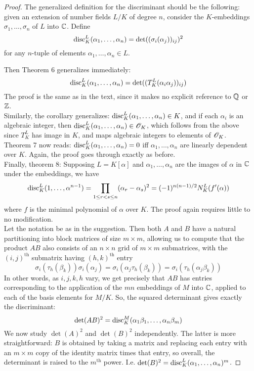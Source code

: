 \begin{proof}
	The generalized definition for the discriminant should be the following: given an extension of number fields $L/K$ of degree $n$, consider the $K$-embeddings $\sigma_1,\ldots,\sigma_n$ of $L$ into $\mathbb{C}$. Define
	\[ \operatorname{disc}^L_K(\alpha_1,\ldots,\alpha_n) = \det((\sigma_i(\alpha_j))_{ij})^2 \]
	for any $n$-tuple of elements $\alpha_1,\ldots,\alpha_n \in L$.
	
	Then Theorem 6 generalizes immediately:
	\[ \operatorname{disc}^L_K(\alpha_1,\ldots,\alpha_n) = \det((T^L_K(\alpha_i\alpha_j))_{ij}) \]
	The proof is the same as in the text, since it makes no explicit reference to $\mathbb{Q}$ or $\mathbb{Z}$. \\
	
	Similarly, the corollary generalizes: $\operatorname{disc}^L_K(\alpha_1,\ldots,\alpha_n) \in K$, and if each $\alpha_i$ is an algebraic integer, then $\operatorname{disc}^L_K(\alpha_1,\ldots,\alpha_n) \in \mathscr{O}_K$, which follows from the above since $T^L_K$ has image in $K$, and maps algebraic integers to elements of $\mathscr{O}_K$. \\
	
	Theorem 7 now reads: $\operatorname{disc}^L_K(\alpha_1,\ldots,\alpha_n) = 0$ iff $\alpha_1,\ldots,\alpha_n$ are linearly dependent over $K$. Again, the proof goes through exactly as before. \\
	
	Finally, theorem 8: Supposing $L = K[\alpha]$ and $\alpha_1,\ldots,\alpha_n$ are the images of $\alpha$ in $\mathbb{C}$ under the embeddings, we have
	\[ \operatorname{disc}^L_K(1,\ldots,\alpha^{n-1}) = \prod_{1 \leq r < s \leq n} (\alpha_r-\alpha_s)^2 = (-1)^{n(n-1)/2}N^L_K(f'(\alpha)) \]
	where $f$ is the minimal polynomial of $\alpha$ over $K$. The proof again requires little to no modification. \\
	
	Let the notation be as in the suggestion. Then both $A$ and $B$ have a natural partitioning into block matrices of size $m \times m$, allowing us to compute that the product $AB$ also consists of an $n \times n$ grid of $m \times m$ submatrices, with the $(i,j)^\text{th}$ submatrix having $(h,k)^\text{th}$ entry
	\[ \sigma_i(\tau_h(\beta_k))\sigma_i(\alpha_j) = \sigma_i(\alpha_j\tau_h(\beta_k)) = \sigma_i(\tau_h(\alpha_j\beta_k)) \]
	In other words, as $i,j,k,h$ vary, we get precisely that $AB$ has entries corresponding to the application of the $mn$ embeddings of $M$ into $\mathbb{C}$, applied to each of the basis elements for $M/K$. So, the squared determinant gives exactly the discriminant:
	\[ \det(AB)^2 = \operatorname{disc}_K^M(\alpha_1\beta_1,\ldots,\alpha_n\beta_m) \]
	We now study $\det(A)^2$ and $\det(B)^2$ independently. The latter is more straightforward: $B$ is obtained by taking a matrix and replacing each entry with an $m \times m$ copy of the identity matrix times that entry, so overall, the determinant is raised to the $m^\text{th}$ power. I.e. $\det(B)^2 = \operatorname{disc}_K^L(\alpha_1,\ldots,\alpha_n)^m$.
	

\end{proof}
